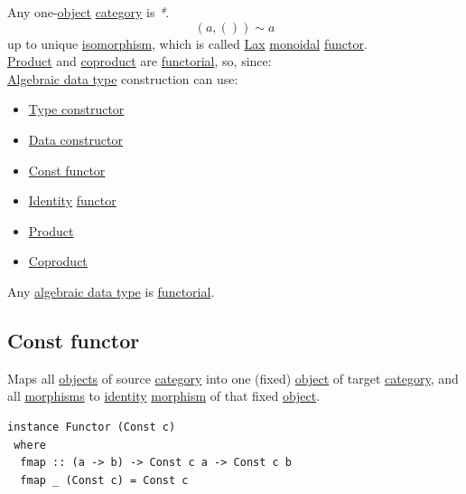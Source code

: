 \documentclass[11pt]{article}
\begin{document}
Any one-\hyperref[org025aac8]{object} \hyperref[org3e3a79b]{category} is \emph{*}.\\

$$ (a, ()) \sim a $$ up to unique \hyperref[org3db0474]{isomorphism}, which is called \hyperref[org678d1cb]{Lax} \hyperref[org71af906]{monoidal} \hyperref[org6073683]{functor}.\\

\hyperref[orga3d1454]{Product} and \hyperref[orge655d87]{coproduct} are \hyperref[org8ac5764]{functorial}, so, since:\\
\hyperref[orgeba275a]{Algebraic data type} construction can use:\\
\begin{itemize}
\item \hyperref[org7285f45]{Type constructor}\\
\item \hyperref[org6dad980]{Data constructor}\\
\item \hyperref[org890965b]{Const functor}\\
\item \hyperref[org3bbbadd]{Identity} \hyperref[org6073683]{functor}\\
\item \hyperref[orga3d1454]{Product}\\
\item \hyperref[orge655d87]{Coproduct}\\
\end{itemize}

Any \hyperref[orgeba275a]{algebraic data type} is \hyperref[org8ac5764]{functorial}.\\

\subsection{\label{org890965b}Const functor}
\label{sec:org9cb8817}

Maps all \hyperref[orge0f000f]{objects} of source \hyperref[org3e3a79b]{category} into one (fixed) \hyperref[org025aac8]{object} of target \hyperref[org3e3a79b]{category}, and all \hyperref[org8ed0ce8]{morphisms} to \hyperref[org3bbbadd]{identity} \hyperref[orgad99fc6]{morphism} of that fixed \hyperref[org025aac8]{object}.\\

\begin{verbatim}
instance Functor (Const c)
 where
  fmap :: (a -> b) -> Const c a -> Const c b
  fmap _ (Const c) = Const c
\end{verbatim}
\end{document}
